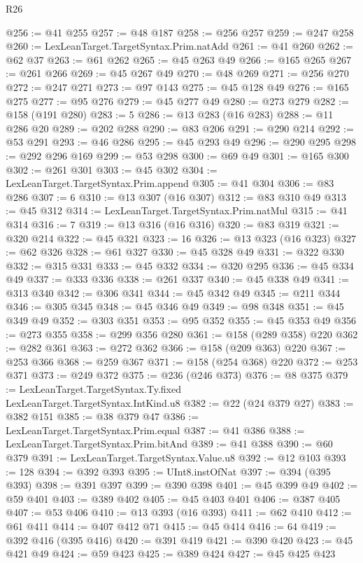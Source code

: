 \begin{lexlean}{R26}
\begin{coremodule}
@256 := @41 @255
@257 := @48 @187
@258 := @256 @257
@259 := @247 @258
@260 := LexLeanTarget.TargetSyntax.Prim.natAdd
@261 := @41 @260
@262 := @62 @37
@263 := @61 @262
@265 := @45 @263 @49
@266 := @165 @265
@267 := @261 @266
@269 := @45 @267 @49
@270 := @48 @269
@271 := @256 @270
@272 := @247 @271
@273 := @97 @143
@275 := @45 @128 @49
@276 := @165 @275
@277 := @95 @276
@279 := @45 @277 @49
@280 := @273 @279
@282 := @158 (@191 @280)
@283 := 5
@286 := @13 @283 (@16 @283)
@288 := @11 @286 @20
@289 := @202 @288
@290 := @83 @206
@291 := @290 @214
@292 := @53 @291
@293 := @46 @286
@295 := @45 @293 @49
@296 := @290 @295
@298 := @292 @296 @169
@299 := @53 @298
@300 := @69 @49
@301 := @165 @300
@302 := @261 @301
@303 := @45 @302
@304 := LexLeanTarget.TargetSyntax.Prim.append
@305 := @41 @304
@306 := @83 @286
@307 := 6
@310 := @13 @307 (@16 @307)
@312 := @83 @310 @49
@313 := @45 @312
@314 := LexLeanTarget.TargetSyntax.Prim.natMul
@315 := @41 @314
@316 := 7
@319 := @13 @316 (@16 @316)
@320 := @83 @319
@321 := @320 @214
@322 := @45 @321
@323 := 16
@326 := @13 @323 (@16 @323)
@327 := @62 @326
@328 := @61 @327
@330 := @45 @328 @49
@331 := @322 @330
@332 := @315 @331
@333 := @45 @332
@334 := @320 @295
@336 := @45 @334 @49
@337 := @333 @336
@338 := @261 @337
@340 := @45 @338 @49
@341 := @313 @340
@342 := @306 @341
@344 := @45 @342 @49
@345 := @211 @344
@346 := @305 @345
@348 := @45 @346 @49
@349 := @98 @348
@351 := @45 @349 @49
@352 := @303 @351
@353 := @95 @352
@355 := @45 @353 @49
@356 := @273 @355
@358 := @299 @356 @280
@361 := @158 (@289 @358) @220
@362 := @282 @361
@363 := @272 @362
@366 := @158 (@209 @363) @220
@367 := @253 @366
@368 := @259 @367
@371 := @158 (@254 @368) @220
@372 := @253 @371
@373 := @249 @372
@375 := @236 (@246 @373)
@376 := @8 @375
@379 := LexLeanTarget.TargetSyntax.Ty.fixed LexLeanTarget.TargetSyntax.IntKind.u8
@382 := @22 (@24 @379 @27)
@383 := @382 @151
@385 := @38 @379 @47
@386 := LexLeanTarget.TargetSyntax.Prim.equal
@387 := @41 @386
@388 := LexLeanTarget.TargetSyntax.Prim.bitAnd
@389 := @41 @388
@390 := @60 @379
@391 := LexLeanTarget.TargetSyntax.Value.u8
@392 := @12 @103
@393 := 128
@394 := @392 @393
@395 := UInt8.instOfNat
@397 := @394 (@395 @393)
@398 := @391 @397
@399 := @390 @398
@401 := @45 @399 @49
@402 := @59 @401
@403 := @389 @402
@405 := @45 @403 @401
@406 := @387 @405
@407 := @53 @406
@410 := @13 @393 (@16 @393)
@411 := @62 @410
@412 := @61 @411
@414 := @407 @412 @71
@415 := @45 @414
@416 := 64
@419 := @392 @416 (@395 @416)
@420 := @391 @419
@421 := @390 @420
@423 := @45 @421 @49
@424 := @59 @423
@425 := @389 @424
@427 := @45 @425 @423

\end{coremodule}
\end{lexlean}
